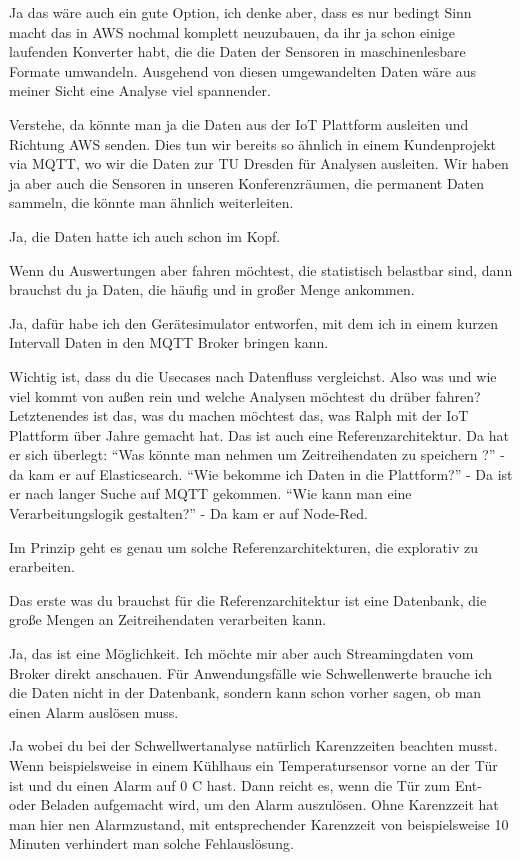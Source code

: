 \LF Ja das wäre auch ein gute Option, ich denke aber, dass es nur bedingt Sinn macht das in \ac{AWS} nochmal komplett neuzubauen, da ihr ja schon einige laufenden Konverter habt, die die Daten der Sensoren in maschinenlesbare Formate umwandeln. Ausgehend von diesen umgewandelten Daten wäre aus meiner Sicht eine Analyse viel spannender.

\PE Verstehe, da könnte man ja die Daten aus der IoT Plattform ausleiten und Richtung \ac{AWS} senden. Dies tun wir bereits so ähnlich in einem Kundenprojekt via \ac{MQTT}, wo wir die Daten zur TU Dresden für Analysen ausleiten. Wir haben ja aber auch die \coo{} Sensoren in unseren Konferenzräumen, die permanent Daten sammeln, die könnte man ähnlich weiterleiten.

\LF Ja, die \coo Daten hatte ich auch schon im Kopf.

\PE Wenn du Auswertungen aber fahren möchtest, die statistisch belastbar sind, dann brauchst du ja Daten, die häufig und in großer Menge ankommen.

\LF Ja, dafür habe ich den Gerätesimulator entworfen, mit dem ich in einem kurzen Intervall Daten in den \ac{MQTT} Broker bringen kann. 

\PE Wichtig ist, dass du die Usecases nach Datenfluss vergleichst. Also was und wie viel kommt von außen rein und welche Analysen möchtest du drüber fahren? Letztenendes ist das, was du machen möchtest das, was Ralph mit der \ac{IoT} Plattform über Jahre gemacht hat. Das ist auch eine Referenzarchitektur. Da hat er sich überlegt: \enquote{Was könnte man nehmen um Zeitreihendaten zu speichern ?} - da kam er auf Elasticsearch. \enquote{Wie bekomme ich Daten in die Plattform?} - Da ist er nach langer Suche auf \ac{MQTT} gekommen. \enquote{Wie kann man eine Verarbeitungslogik gestalten?} - Da kam er auf Node-Red.

\LF Im Prinzip geht es genau um solche Referenzarchitekturen, die explorativ zu erarbeiten. 

\PE Das erste was du brauchst für die Referenzarchitektur ist eine Datenbank, die große Mengen an Zeitreihendaten verarbeiten kann.

\LF Ja, das ist eine Möglichkeit. Ich möchte mir aber auch Streamingdaten vom Broker direkt anschauen. Für Anwendungsfälle wie Schwellenwerte brauche ich die Daten nicht in der Datenbank, sondern kann schon vorher sagen, ob man einen Alarm auslösen muss.

\PE Ja wobei du bei der Schwellwertanalyse natürlich Karenzzeiten beachten musst. Wenn beispielsweise in einem Kühlhaus ein Temperatursensor vorne an der Tür ist und du einen Alarm auf 0 \textdegree{}C hast. Dann reicht es, wenn die Tür zum Ent- oder Beladen aufgemacht wird, um den Alarm auszulösen. Ohne Karenzzeit hat man hier nen Alarmzustand, mit entsprechender Karenzzeit von beispielsweise 10 Minuten verhindert man solche Fehlauslösung.

